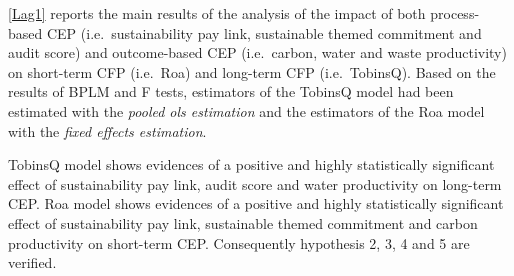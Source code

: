 \documentclass[]{article}
\begin{document}
\autoref{Lag1} reports the main results of the analysis of the impact of
both process-based CEP (i.e.~sustainability pay link, sustainable themed
commitment and audit score) and outcome-based CEP (i.e.~carbon, water
and waste productivity) on short-term CFP (i.e.~Roa) and long-term CFP
(i.e.~TobinsQ). Based on the results of BPLM and F tests, estimators of
the TobinsQ model had been estimated with the \emph{pooled ols
estimation} and the estimators of the Roa model with the \emph{fixed
effects estimation}.

TobinsQ model shows evidences of a positive and highly statistically
significant effect of sustainability pay link, audit score and water
productivity on long-term CEP. Roa model shows evidences of a positive
and highly statistically significant effect of sustainability pay link,
sustainable themed commitment and carbon productivity on short-term CEP.
Consequently hypothesis 2, 3, 4 and 5 are verified.
\end{document}
